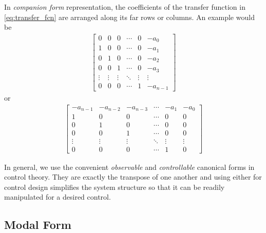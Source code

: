 In \textit{companion form} representation, the coefficients of the transfer function in \eqref{eq:transfer_fcn} are arranged along its far rows or columns. An example would be 
%
\begin{align}
	\begin{bmatrix} 0 & 0 & 0 & \cdots & 0 & -a_0 \\
	1 & 0 & 0 & \cdots & 0 & -a_1 \\
	0 & 1 & 0 & \cdots & 0 & -a_2 \\
	0 & 0 & 1 & \cdots & 0 & -a_3 \\
	\vdots & \vdots & \vdots &\ddots & \vdots & \vdots \\
	0 & 0 & 0 & \cdots & 1 & -a_{n-1} 
	\end{bmatrix}
\end{align}
%
or
%
\begin{align}
	\begin{bmatrix} -a_{n-1} & -a_{n-2} & -a_{n-3} & \cdots & -a_1 & -a_0 \\
	1 & 0 & 0 & \cdots & 0 & 0 \\
	0 & 1 & 0 & \cdots & 0 & 0 \\
	0 & 0 & 1 & \cdots & 0 & 0 \\
	\vdots & \vdots & \vdots &\ddots & \vdots & \vdots \\
	0 & 0 & 0 & \cdots & 1 & 0 
	\end{bmatrix}
\end{align}

In general, we use the convenient \textit{observable} and \textit{controllable} canonical forms in control theory. They are exactly the transpose of one another and using either for control design simplifies the system structure so that it can be readily manipulated for a desired control.

\subsection{Modal Form}

